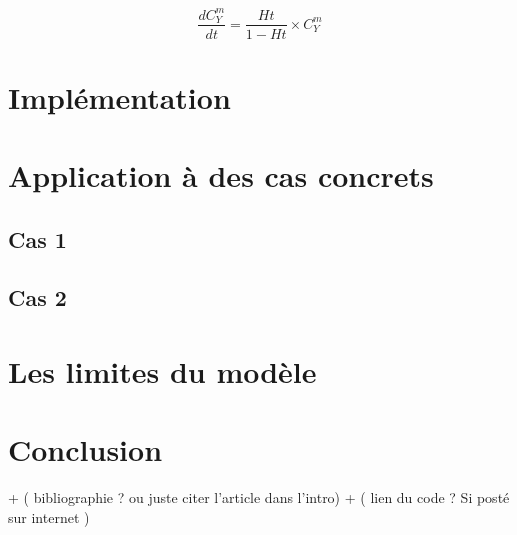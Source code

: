 \documentclass[a4paper,fleqn]{article}
\begin{document}
\begin{equation}
\frac{dC_{Y}^m}{dt}={\frac{Ht}{1 - Ht}}\times{C_{Y}^m}
\end{equation}


\section{Implémentation}   






\section{Application à des cas concrets}     

\subsection{Cas 1} 

\subsection{Cas 2} 

\section{Les limites du modèle}


\section{Conclusion} 

+ ( bibliographie ? ou juste citer l'article dans l'intro)
+ ( lien du code ? Si posté sur internet )
 







\end{document}

